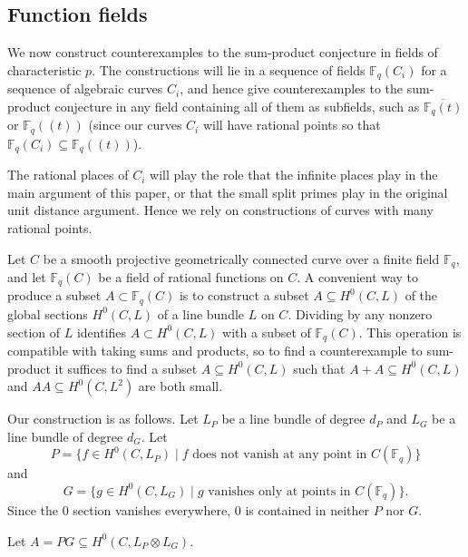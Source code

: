 \documentclass{amsart}
\numberwithin{equation}{section}
\begin{document}
\subsection{Function fields}

We now construct counterexamples to the sum-product conjecture in fields of characteristic $p$. The constructions will lie in a sequence of fields $\mathbb F_q(C_i)$ for a sequence of algebraic curves $C_i$, and hence give counterexamples to the sum-product conjecture in any field containing all of them as subfields, such as $\overline{\mathbb F_q(t)}$ or $\mathbb F_q((t))$ (since our curves $C_i$ will have rational points so that $\mathbb F_q(C_i) \subseteq \mathbb F_q((t))$).

The rational places of $C_i$ will play the role that the infinite places play in the main argument of this paper, or that the small split primes play in the original unit distance argument. Hence we rely on constructions of curves with many rational points.

Let $C$ be a smooth projective geometrically connected curve over a finite field $\mathbb F_q$, and let $\mathbb F_q(C)$ be a field of rational functions on $C$. A convenient way to produce a subset $A \subset \mathbb F_q(C)$ is to construct a subset $A \subseteq H^0(C,L)$ of the global sections $H^0(C,L)$ of a line bundle $L$ on $C$. Dividing by any nonzero section of $L$ identifies $A \subset H^0(C,L)$ with a subset of $\mathbb F_q(C)$. This operation is compatible with taking sums and products, so to find a counterexample to sum-product it suffices to find a subset $A \subseteq H^0(C,L)$ such that $A + A \subseteq H^0(C,L)$ and $AA \subseteq H^0(C,L^{ 2})$ are both small. 

Our construction is as follows. Let $L_P$ be a line bundle of degree $d_P$ and $L_G$ be a line bundle of degree $d_G$. Let 
\[ P = \{ f \in H^0(C, L_P) \mid f \textrm{ does not vanish at any point in } C(\mathbb F_q)\}\]
and
\[G = \{ g \in H^0(C, L_G) \mid g \textrm{ vanishes only at points in } C(\mathbb F_q)\}.\]
Since the $0$ section vanishes everywhere, $0$ is contained in neither $P$ nor $G$.

Let $A = P G \subseteq H^0(C, L_P \otimes L_G)$. 
\end{document}
